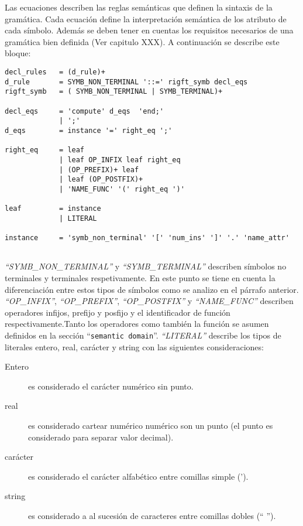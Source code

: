 Las ecuaciones describen las reglas semánticas que definen la sintaxis de la gramática. Cada ecuación define la interpretación semántica de los atributo de cada símbolo. Además se deben tener en cuentas los requisitos necesarios de una gramática bien definida (Ver capitulo XXX).  
A continuación se describe este bloque:
\begin{center}
\lstset{language=inform}
\tiny
\begin{lstlisting}[frame=single]
decl_rules   = (d_rule)+ 
d_rule       = SYMB_NON_TERMINAL '::=' rigft_symb decl_eqs
rigft_symb   = ( SYMB_NON_TERMINAL | SYMB_TERMINAL)+

decl_eqs     = 'compute' d_eqs  'end;'
             | ';'
d_eqs        = instance '=' right_eq ';'

right_eq     = leaf
             | leaf OP_INFIX leaf right_eq
             | (OP_PREFIX)+ leaf
             | leaf (OP_POSTFIX)+
             | 'NAME_FUNC' '(' right_eq ')' 

leaf         = instance
             | LITERAL

instance     = 'symb_non_terminal' '[' 'num_ins' ']' '.' 'name_attr'
            
\end{lstlisting}
\end{center}
\textit{``SYMB\_NON\_TERMINAL''} y \textit{``SYMB\_TERMINAL''} describen símbolos no terminales y terminales respetivamente. En este punto se tiene en cuenta la diferenciación entre estos tipos de símbolos como se analizo en el párrafo anterior. 
\textit{``OP\_INFIX''}, \textit{``OP\_PREFIX''}, \textit{``OP\_POSTFIX''} y  \textit{``NAME\_FUNC''} describen operadores infijos, prefijo y posfijo y el identificador de función respectivamente.Tanto los operadores como también la función se asumen definidos en la sección ``\texttt{semantic domain}''.
\textit{``LITERAL''} describe los tipos de literales entero, real, carácter y string con las siguientes consideraciones:
\begin{description}
\item [Entero] es considerado el carácter numérico sin punto.
\item [real] es considerado cartear numérico numérico son un punto (el punto es considerado para separar valor decimal).
\item [carácter] es considerado el carácter alfabético entre comillas simple (').
\item [string] es considerado a al sucesión de caracteres entre comillas dobles (`` '').
\end{description}

